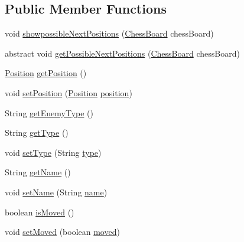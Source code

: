 \subsection*{Public Member Functions}
\begin{DoxyCompactItemize}
\item 
void \hyperlink{classmodel_chess_pieces_1_1_chess_piece_a70a2f0f1a29b9545fcad604df3ad89c2}{showpossible\+Next\+Positions} (\hyperlink{classmodel_core_1_1_chess_board}{Chess\+Board} chess\+Board)
\item 
abstract void \hyperlink{classmodel_chess_pieces_1_1_chess_piece_a2620c9629424998a33babb6a55ffa6d1}{get\+Possible\+Next\+Positions} (\hyperlink{classmodel_core_1_1_chess_board}{Chess\+Board} chess\+Board)
\item 
\hyperlink{classmodel_core_1_1_position}{Position} \hyperlink{classmodel_chess_pieces_1_1_chess_piece_a6e88271516d06a50162a36321d10ff0e}{get\+Position} ()
\item 
void \hyperlink{classmodel_chess_pieces_1_1_chess_piece_abdd69cca4ca429e531ab58297c0036c7}{set\+Position} (\hyperlink{classmodel_core_1_1_position}{Position} \hyperlink{classmodel_chess_pieces_1_1_chess_piece_a3d4362d5b28f6edb14161196d9c6807d}{position})
\item 
String \hyperlink{classmodel_chess_pieces_1_1_chess_piece_a09214c36497f15c4d85af11a8dd8bfed}{get\+Enemy\+Type} ()
\item 
String \hyperlink{classmodel_chess_pieces_1_1_chess_piece_a189d923d883085ce16d051c161c93e68}{get\+Type} ()
\item 
void \hyperlink{classmodel_chess_pieces_1_1_chess_piece_a7d2fa4377c4409371487f3e5afd5e100}{set\+Type} (String \hyperlink{classmodel_chess_pieces_1_1_chess_piece_a195487ca88c197af7c1604247be31db2}{type})
\item 
String \hyperlink{classmodel_chess_pieces_1_1_chess_piece_ac73d3ae34142cdbf7571a086ffb122c9}{get\+Name} ()
\item 
void \hyperlink{classmodel_chess_pieces_1_1_chess_piece_a86e3e4135360b5bdc7ce9f6bad817b99}{set\+Name} (String \hyperlink{classmodel_chess_pieces_1_1_chess_piece_a03d2fb76fbbff0dab72d00f2173a69ff}{name})
\item 
boolean \hyperlink{classmodel_chess_pieces_1_1_chess_piece_ad6b3bbf9101c70a29ad8087f9431b8ee}{is\+Moved} ()
\item 
void \hyperlink{classmodel_chess_pieces_1_1_chess_piece_a43b4de8cc87600ac934d85cb09c852a1}{set\+Moved} (boolean \hyperlink{classmodel_chess_pieces_1_1_chess_piece_a5bc0722badda5dc066b6a73476fc933c}{moved})
\end{DoxyCompactItemize}
